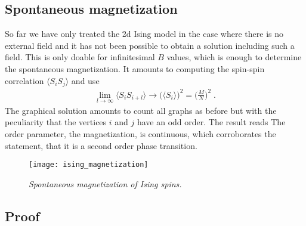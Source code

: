 \subsection{Spontaneous magnetization}
So far we have only treated the 2d Ising model in the case where there is no external field and it has not been possible to obtain a solution including such a field. This is only doable for infinitesimal $B$ values, which is enough to determine the spontaneous 
magnetization. It amounts to computing the spin-spin correlation $\langle S_{i} S_{j}\rangle$ and use
%
\begin{align*}
\lim_{l\to\infty} \langle S_{i}  S_{i+l}\rangle \longrightarrow \bigg(  \langle S_{i} \rangle\bigg)^{2}
= \bigg(\frac{M}{N }\bigg)^{2}\;.
\end{align*}
%
The graphical solution amounts to count all graphs as before but with the peculiarity that 
the vertices $i$ and $j$ have an odd order.
The result reads
The order parameter, the magnetization, is continuous, which corroborates 
the statement, that it is a second order phase transition.
%
\begin{figure}[t]
\begin{center}
\texttt{[image: ising\_magnetization]}
\caption{{\it Spontaneous magnetization of Ising spins.}}
\end{center}
\end{figure}
%

%
\subsection{Proof}

